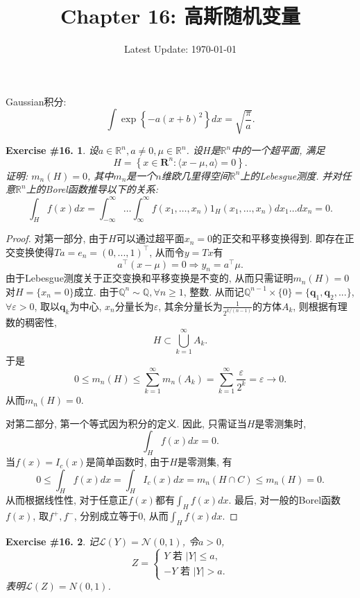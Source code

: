 \documentclass[UTF8, a4paper]{article}
\title{Chapter 16: 高斯随机变量}
\author{}
\date{Latest Update: \today}
\newtheorem{exercise}{Exercise \#16.}
\begin{document}
\maketitle

Gaussian积分:
$$
\int \exp\left\{-a(x+b)^2\right\} dx = \sqrt{\frac{\pi}{a}}.
$$


\begin{framed}
\begin{exercise}
设\(a \in \mathbb{R}^n, a \neq 0, \mu \in \mathbb{R}^n\).
设\(H\)是\(\mathbb{R}^n\)中的一个超平面, 满足
$$
H=\left\{x \in \mathbf{R}^n:\langle x-\mu, a\rangle=0\right\} .
$$
证明: \(m_n(H) = 0\), 其中\(m_n\)是一个\(n\)维欧几里得空间\(\mathbb{R}^n\)上的Lebesgue测度.
并对任意\(\mathbb{R}^n\)上的Borel函数推导以下的关系:
$$
\int_H f(x) d x=\int_{-\infty}^{\infty} \ldots \int_{\infty}^{\infty} f\left(x_1, \ldots, x_n\right) 1_H\left(x_1, \ldots, x_n\right) d x_1 \ldots d x_n=0.
$$
\end{exercise}
\end{framed}

\begin{proof}
对第一部分, 由于\(H\)可以通过超平面\(x_n = 0\)的正交和平移变换得到.
即存在正交变换使得\(Ta = e_n = (0, ..., 1)^\top\), 从而令\(y = Tx\)有
$$
a^\top (x - \mu) = 0  \Rightarrow y_n = a^\top \mu.
$$
由于Lebesgue测度关于正交变换和平移变换是不变的, 从而只需证明\(m_n(H) = 0\)对\(H = \{x_n = 0\}\)成立.
由于\(\mathbb{Q}^{n} \sim \mathbb{Q}, \forall n \geq 1\), 整数. 
从而记\(\mathbb{Q}^{n-1}\times \{0\} = \{\mathbf{q}_1, \mathbf{q}_2, ...\}\), 
\(\forall \varepsilon >0\), 取以\(\mathbf{q}_k\)为中心, \(x_n\)分量长为\(\varepsilon\), 其余分量长为\(\frac{1}{2^{k/(n-1)}}\)的方体\(A_k\), 则根据有理数的稠密性, 
$$
H \subset \bigcup_{k=1}^{\infty} A_k.
$$
于是
$$
0 \leq m_n(H) \leq \sum_{k=1}^{\infty} m_n(A_k) = \sum_{k=1}^{\infty} \frac{\varepsilon}{2^{k}} = \varepsilon \to 0.
$$
从而\(m_n(H) = 0\).


对第二部分, 第一个等式因为积分的定义. 因此, 只需证当\(H\)是零测集时, 
$$
\int_H f(x) d x= 0.
$$
当\(f(x) = I_c(x)\)是简单函数时, 由于\(H\)是零测集, 有
$$
0 \leq \int_H f(x) d x=  \int_H I_c(x) d x = m_n(H \cap C) \leq m_n(H) = 0.
$$
从而根据线性性, 对于任意正\(f(x)\)都有\(\int_H f(x) d x\).
最后, 对一般的Borel函数\(f(x)\), 取\(f^+, f^-\), 分别成立等于0, 从而\(\int_H f(x) d x\).
\end{proof}


\begin{framed}
\begin{exercise}
记\(\mathcal{L}(Y) = \mathcal{N}(0, 1)\), 令\(a > 0\), 
$$
Z=\left\{\begin{array}{c}
Y \text { 若 }|Y| \leq a, \\
-Y \text { 若 }|Y|>a .
\end{array}\right.
$$
表明\(\mathcal{L}(Z) = N(0, 1)\).
\end{exercise}
\end{framed}
\end{document}
